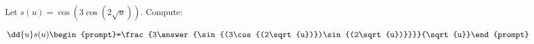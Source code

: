 \documentclass{ximera}
\author{Bart Snapp\and Nela Lakos}
\begin{document}
\begin{exercise}
Let $s(u) = \cos \left(3 \cos \left(2  \sqrt{u}\right)\right)$. Compute:

\[
\dd{u}s(u)
\begin{prompt}=\frac{3\answer{\sin{(3\cos{(2\sqrt{u})})\sin{(2\sqrt{u})}}}}{\sqrt{u}}\end{prompt}
\]
\end{exercise}
\end{document}
